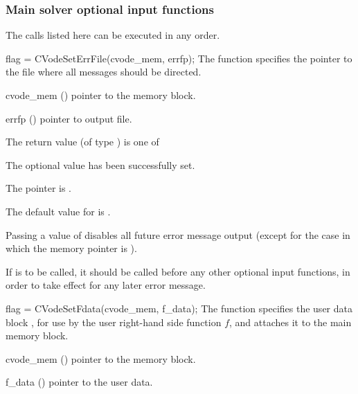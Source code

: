 \subsubsection{Main solver optional input functions}\label{sss:optin_main}

The calls listed here can be executed in any order. 

{
flag = CVodeSetErrFile(cvode\_mem, errfp);
}
{
  The function  specifies the pointer to the file
  where all {\cvode} messages should be directed.
}
{
  \begin{args}
  \item[cvode\_mem] ()
    pointer to the {\cvode} memory block.
  \item[errfp] ()
    pointer to output file.
  \end{args}
}
{
  The return value  (of type ) is one of
  \begin{args}
  \item[\Id{CV\_SUCCESS}] 
    The optional value has been successfully set.
  \item[\Id{CV\_MEM\_NULL}]
    The  pointer is .
  \end{args}
}
{
  The default value for  is . 

  Passing a value of  disables all future error message output
  (except for the case in which the {\cvode} memory pointer is ).

  {\warn} If  is to be called, it should be called before any
  other optional input functions, in order to take effect for any later error message.
}
{
  flag = CVodeSetFdata(cvode\_mem, f\_data);
}
{
  The function  specifies the user data block ,
  for use by the user right-hand side function $f$, and attaches it to the main 
  {\cvode} memory block.
}
{
  \begin{args}
  \item[cvode\_mem] ()
    pointer to the {\cvode} memory block.
  \item[f\_data] ()
    pointer to the user data.
  \end{args}
}
